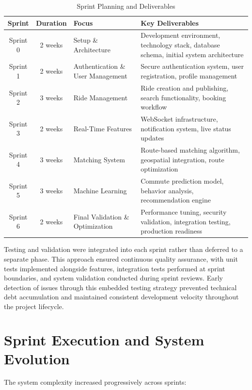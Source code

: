 \begin{table}[H]
\centering
\begin{tabular}{|c|c|p{4cm}|p{5cm}|}
\hline
\textbf{Sprint} & \textbf{Duration} & \textbf{Focus} & \textbf{Key Deliverables} \\
\hline
Sprint 0& 2 weeks & Setup \& Architecture & Development environment, technology stack, database schema, initial system architecture \\
\hline
Sprint 1& 2 weeks & Authentication \& User Management & Secure authentication system, user registration, profile management \\
\hline
Sprint 2 & 3 weeks & Ride Management & Ride creation and publishing, search functionality, booking workflow \\
\hline
Sprint 3 & 2 weeks & Real-Time Features & WebSocket infrastructure, notification system, live status updates \\
\hline
Sprint 4 & 3 weeks & Matching System & Route-based matching algorithm, geospatial integration, route optimization \\
\hline
Sprint 5 & 3 weeks & Machine Learning & Commute prediction model, behavior analysis, recommendation engine \\
\hline
Sprint 6 & 2 weeks & Final Validation \& Optimization & Performance tuning, security validation, integration testing, production readiness \\
\hline
\end{tabular}
\caption{Sprint Planning and Deliverables}
\label{tab:sprints}
\end{table}

Testing and validation were integrated into each sprint rather than deferred to a separate phase. This approach ensured continuous quality assurance, with unit tests implemented alongside features, integration tests performed at sprint boundaries, and system validation conducted during sprint reviews. Early detection of issues through this embedded testing strategy prevented technical debt accumulation and maintained consistent development velocity throughout the project lifecycle.

\section{Sprint Execution and System Evolution}

The system complexity increased progressively across sprints:

